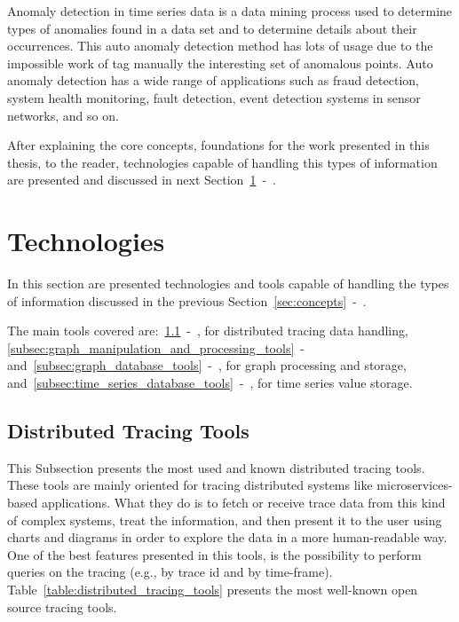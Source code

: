 Anomaly detection in time series data is a data mining process used to determine types of anomalies found in a data set and to determine details about their occurrences. This auto anomaly detection method has lots of usage due to the impossible work of tag manually the interesting set of anomalous points. Auto anomaly detection has a wide range of applications such as fraud detection, system health monitoring, fault detection, event detection systems in sensor networks, and so on.

After explaining the core concepts, foundations for the work presented in this thesis, to the reader, technologies capable of handling this types of information are presented and discussed in next Section~\ref{sec:technologies}~-~.

\section{Technologies}
\label{sec:technologies}

In this section are presented technologies and tools capable of handling the types of information discussed in the previous Section~\ref{sec:concepts}~-~.

The main tools covered are:~\ref{subsec:distributed_tracing_tools}~-~, for distributed tracing data handling, \ref{subsec:graph_manipulation_and_processing_tools}~-~ and~\ref{subsec:graph_database_tools}~-~, for graph processing and storage, and~\ref{subsec:time_series_database_tools}~-~, for time series value storage.

\subsection{Distributed Tracing Tools}
\label{subsec:distributed_tracing_tools}

This Subsection presents the most used and known distributed tracing tools. These tools are mainly oriented for tracing distributed systems like microservices-based applications. What they do is to fetch or receive trace data from this kind of complex systems, treat the information, and then present it to the user using charts and diagrams in order to explore the data in a more human-readable way. One of the best features presented in this tools, is the possibility to perform queries on the tracing (e.g., by trace id and by time-frame). Table~\ref{table:distributed_tracing_tools} presents the most well-known open source tracing tools.

